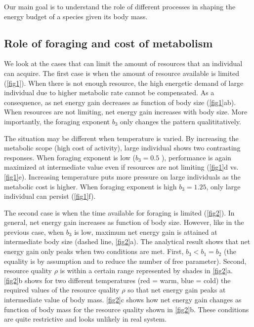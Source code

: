 Our main goal is to understand the role of different processes in shaping the energy budget of a species given its body mass.


\subsection*{Role of foraging and cost of metabolism}
We look at the cases that can limit the amount of resources that an individual can acquire.
The first case is when the amount of resource available is limited (\cref{fig1}).
When there is not enough resource, the high energetic demand of large individual due to higher metabolic rate cannot be compensated.
As a consequence, as net energy gain decreases as function of body size (\cref{fig1}ab).
When resources are not limiting, net energy gain increases with body size.
More importantly, the foraging exponent $b_3$ only changes the pattern qualititatively.

The situation may be different when temperature is varied.
By increasing the metabolic scope (high cost of activity), large individual shows two contrasting responses.
When foraging exponent is low ($b_3 = 0.5$ ), performance is again maximized at intermediate value even if resources are not limiting (\cref{fig1}d vs. \cref{fig1}e).
Increasing temperature puts more pressure on large individuals as the metabolic cost is higher.
When foraging exponent is high $b_3 = 1.25$, only large individual can persist (\cref{fig1}f).

The second case is when the time available for foraging is limited (\cref{fig2}).
In general, net energy gain increases as function of body size.
However, like in the previous case, when $b_3$ is low, maximum net energy gain is attained at intermediate body size (dashed line, \cref{fig2}a). 
The analytical result shows that net energy gain only peaks when two conditions  are met.
First, $b_3 < b_1 = b_2$ (the equality is by assumption and to reduce the number of free parameter).
Second, resource quality $\rho$ is within a certain range represented by shades in \cref{fig2}a.
\cref{fig2}b shows for two different temperatures (red = warm, blue = cold) the required values of the resource quality $\rho$ so that net energy gain peaks at intermediate value of body mass.
\cref{fig2}c shows how net energy gain changes as function of body mass for the resource quality shown in \cref{fig2}b.
These conditions are quite restrictive and looks unlikely in real system.

